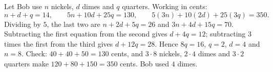 Let Bob use $n$ nickels, $d$ dimes and $q$ quarters. Working in cents:
\[n+d+q=14,\qquad5n+10d+25q=130,\qquad5(3n)+10(2d)+25(3q)=350.\]
Dividing by $5$, the last two are $n+2d+5q=26$ and $3n+4d+15q=70$. Subtracting the first equation from the second gives $d+4q=12$; subtracting $3$ times the first from the third gives $d+12q=28$. Hence $8q=16$, $q=2$, $d=4$ and $n=8$. Check: $40+40+50=130$ cents, and $3\cdot8$ nickels, $2\cdot4$ dimes and $3\cdot2$ quarters make $120+80+150=350$ cents. Bob used $\boxed{4}$ dimes.
